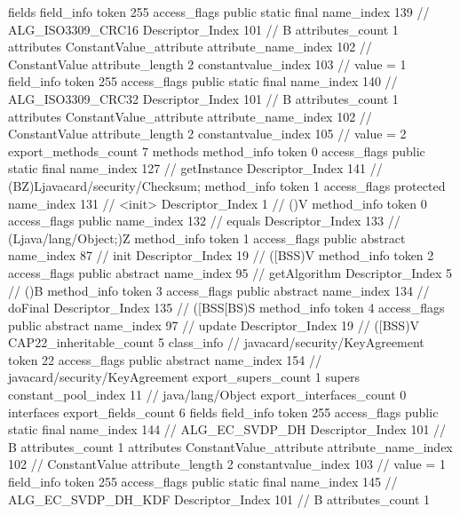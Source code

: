 {{{			fields {
			field_info {
				token	255
				access_flags	public static final
				name_index	139		// ALG_ISO3309_CRC16
				Descriptor_Index	101		// B
				attributes_count	1
				attributes {
				ConstantValue_attribute {
					attribute_name_index	102		// ConstantValue
					attribute_length	2
					constantvalue_index	103		// value = 1
				}
				}
			}
			field_info {
				token	255
				access_flags	public static final
				name_index	140		// ALG_ISO3309_CRC32
				Descriptor_Index	101		// B
				attributes_count	1
				attributes {
				ConstantValue_attribute {
					attribute_name_index	102		// ConstantValue
					attribute_length	2
					constantvalue_index	105		// value = 2
				}
				}
			}
			}
			export_methods_count	7
			methods {
				method_info {
					token	0
					access_flags	public static final
					name_index	127		// getInstance
					Descriptor_Index	141		// (BZ)Ljavacard/security/Checksum;
				}
				method_info {
					token	1
					access_flags	protected
					name_index	131		// <init>
					Descriptor_Index	1		// ()V
				}
				method_info {
					token	0
					access_flags	public
					name_index	132		// equals
					Descriptor_Index	133		// (Ljava/lang/Object;)Z
				}
				method_info {
					token	1
					access_flags	public abstract
					name_index	87		// init
					Descriptor_Index	19		// ([BSS)V
				}
				method_info {
					token	2
					access_flags	public abstract
					name_index	95		// getAlgorithm
					Descriptor_Index	5		// ()B
				}
				method_info {
					token	3
					access_flags	public abstract
					name_index	134		// doFinal
					Descriptor_Index	135		// ([BSS[BS)S
				}
				method_info {
					token	4
					access_flags	public abstract
					name_index	97		// update
					Descriptor_Index	19		// ([BSS)V
				}
			}
			CAP22_inheritable_count	5
		}
		class_info {		// javacard/security/KeyAgreement
			token	22
			access_flags	public abstract
			name_index	154		// javacard/security/KeyAgreement
			export_supers_count	1
			supers {
				constant_pool_index	11		// java/lang/Object
			}
			export_interfaces_count	0
			interfaces {
			}
			export_fields_count	6
			fields {
			field_info {
				token	255
				access_flags	public static final
				name_index	144		// ALG_EC_SVDP_DH
				Descriptor_Index	101		// B
				attributes_count	1
				attributes {
				ConstantValue_attribute {
					attribute_name_index	102		// ConstantValue
					attribute_length	2
					constantvalue_index	103		// value = 1
				}
				}
			}
			field_info {
				token	255
				access_flags	public static final
				name_index	145		// ALG_EC_SVDP_DH_KDF
				Descriptor_Index	101		// B
				attributes_count	1
}}}}}
